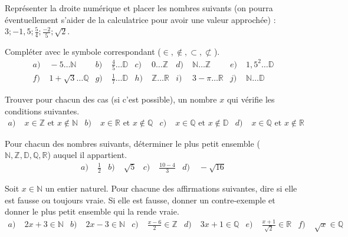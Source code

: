 \documentclass[11pt]{article}
\begin{document}

\begin{exo}
  Représenter la droite numérique et placer les nombres suivants (on pourra
  éventuellement s'aider de la calculatrice pour avoir une valeur approchée) :
  $3; -1,5; \frac{5}{4}; \frac{-2}{5}; \sqrt 2$.
\end{exo}

\begin{exo}
  Compléter avec le symbole correspondant ($\in, \notin, \subset, \not\subset$).
  \begin{align*}
  a)&\; -5 \ldots \mathbb{N} &
  b)&\; \frac{4}{5} \ldots \mathbb{D} &
  c)&\; 0 \ldots \mathbb{Z} &
  d)&\; \mathbb{N} \ldots \mathbb{Z} &
  e)&\; 1,5^2 \ldots \mathbb{D} \\
  f)&\; 1+\sqrt 3 \ldots \mathbb{Q} &
  g)&\; \frac{1}{7} \ldots \mathbb{D} &
  h)&\; \mathbb{Z} \ldots \mathbb{R} &
  i)&\; 3-\pi \ldots \mathbb{R} &
  j)&\; \mathbb{N} \ldots \mathbb{D}
\end{align*}
\end{exo}

\begin{exo}
  Trouver pour chacun des cas (si c'est possible), un nombre $x$ qui vérifie les
  conditions suivantes.
  \begin{align*}
    a)&\; x \in \mathbb{Z}\text{ et } x \notin \mathbb{N} &
    b)&\; x \in \mathbb{R}\text{ et } x \notin \mathbb{Q} &
    c)&\; x \in \mathbb{Q}\text{ et } x \notin \mathbb{D} &
    d)&\; x \in \mathbb{Q}\text{ et } x \notin \mathbb{R} 
  \end{align*}
\end{exo}

\begin{exo}
  Pour chacun des nombres suivants, déterminer le plus petit ensemble
  ($\mathbb{N}, \mathbb{Z}, \mathbb{D}, \mathbb{Q}, \mathbb{R}$) auquel il
  appartient.
  \begin{align*}
    a)&\; \frac{1}{2} &
    b)&\; \sqrt 5 &
    c)&\; \frac{10-4}{3} &
    d)&\; -\sqrt{16}
  \end{align*}
\end{exo}

\begin{exo}
  Soit $x\in\mathbb{N}$ un entier naturel. Pour chacune des affirmations
  suivantes, dire si elle est fausse ou toujours vraie. Si elle est fausse,
  donner un contre-exemple et donner le plus petit ensemble qui la rende
  vraie.
  \begin{align*}
    a)&\; 2x+3\in\mathbb{N} &
    b)&\; 2x-3\in\mathbb{N} &
    c)&\; \frac{x-6}{2}\in\mathbb{Z} &
    d)&\; 3x+1\in\mathbb{Q} &
    e)&\; \frac{x+1}{\sqrt 2}\in\mathbb{R} &
    f)&\; \sqrt x\in\mathbb{Q}
  \end{align*}
\end{exo}
\end{document}
